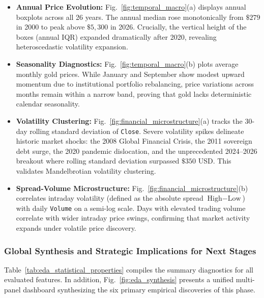 \documentclass[conference]{IEEEtran}
\begin{document}
\begin{itemize}
    \item \textbf{Annual Price Evolution:} Fig.~\ref{fig:temporal_macro}(a) displays annual boxplots across all 26 years. The annual median rose monotonically from $\$279$ in 2000 to peak above $\$5{,}300$ in 2026. Crucially, the vertical height of the boxes (annual IQR) expanded dramatically after 2020, revealing heteroscedastic volatility expansion.
    \item \textbf{Seasonality Diagnostics:} Fig.~\ref{fig:temporal_macro}(b) plots average monthly gold prices. While January and September show modest upward momentum due to institutional portfolio rebalancing, price variations across months remain within a narrow band, proving that gold lacks deterministic calendar seasonality.
    \item \textbf{Volatility Clustering:} Fig.~\ref{fig:financial_microstructure}(a) tracks the 30-day rolling standard deviation of \texttt{Close}. Severe volatility spikes delineate historic market shocks: the 2008 Global Financial Crisis, the 2011 sovereign debt surge, the 2020 pandemic dislocation, and the unprecedented 2024--2026 breakout where rolling standard deviation surpassed $\$350$ USD. This validates Mandelbrotian volatility clustering.
    \item \textbf{Spread-Volume Microstructure:} Fig.~\ref{fig:financial_microstructure}(b) correlates intraday volatility (defined as the absolute spread $\text{High} - \text{Low}$) with daily \texttt{Volume} on a semi-log scale. Days with elevated trading volume correlate with wider intraday price swings, confirming that market activity expands under volatile price discovery.
\end{itemize}

\subsubsection{Global Synthesis and Strategic Implications for Next Stages}
Table~\ref{tab:eda_statistical_properties} compiles the summary diagnostics for all evaluated features. In addition, Fig.~\ref{fig:eda_synthesis} presents a unified multi-panel dashboard synthesizing the six primary empirical discoveries of this phase.
\end{document}
